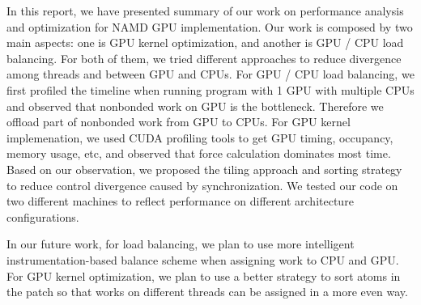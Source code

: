 In this report, we have presented summary of our work on performance analysis and optimization for NAMD GPU implementation.
Our work is composed by two main aspects: one is GPU kernel optimization, and another is GPU / CPU load balancing. For both of them,
we tried different approaches to reduce divergence among threads and between GPU and CPUs. For GPU / CPU load balancing,
we first profiled the timeline when running program with 1 GPU with multiple CPUs and observed that nonbonded work on GPU is the bottleneck. Therefore
we offload part of nonbonded work from GPU to CPUs. For GPU kernel implemenation, we used CUDA profiling tools to get
GPU timing, occupancy, memory usage, etc, and observed that force calculation dominates most time. Based on our observation,
we proposed the tiling approach and sorting strategy to reduce control divergence caused by synchronization. We tested our code on two different machines to reflect
performance on different architecture configurations. 

In our future work, for load balancing, we plan to use more intelligent instrumentation-based balance scheme when assigning work to CPU and GPU.
For GPU kernel optimization, we plan to use a better strategy to sort atoms in the patch so that works on different threads can be assigned in a more even way.
